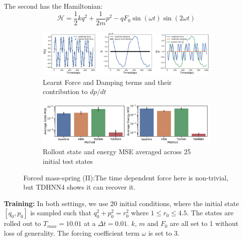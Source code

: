 \documentclass[twoside]{article}
\begin{document}
The second has the Hamiltonian:
\begin{equation}
\mathcal{H} = \frac{1}{2}kq^2 + \frac{1}{2m}p^2 - qF_0\sin(\omega t)\sin(2\omega t)
\end{equation}
\begin{figure}[h!]
\centering
\captionsetup{justification=centering}
	\begin{subfigure}[b]{0.48\textwidth}
		\centering
		\includegraphics[width=\textwidth]{figures/figures/forced_mass_spring/2/forced_mass_spring_dpdt_0.pdf}
		\caption{Learnt Force and Damping terms and their contribution to $dp/dt$}
	\end{subfigure}
	\begin{subfigure}[b]{0.48\textwidth}
	    \centering
		\includegraphics[width=\textwidth]{figures/figures/forced_mass_spring/2/forced_mass_spring_errors_0.pdf}
		\caption{Rollout state and energy MSE averaged across 25 initial test states}
	\end{subfigure}
\caption{Forced mass-spring (II):The time dependent force here is non-trivial, but TDHNN4 shows it can recover it.}
\label{fig.fmspring2}
\end{figure}
\textbf{Training:} In both settings, we use 20 initial conditions, where the initial state $[q_0,p_0]$ is sampled such that $q_0^2 +p_0^2 =r_0^2$ where $1 \leq r_0 \leq 4.5$. The states are rolled out to $T_{max}=10.01$ at a $\Delta t = 0.01$. $k$, $m$ and $F_0$ are all set to 1 without loss of generality. The forcing coefficient term $\omega$ is set to 3. 
\end{document}
